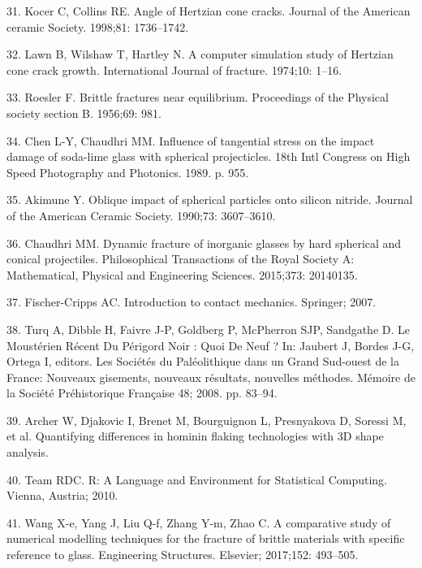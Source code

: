 \documentclass[10pt,letterpaper]{article}
\newenvironment{cslreferences}%
  {}%
  {\par}
\begin{document}
\begin{cslreferences}
\leavevmode\hypertarget{ref-kocer_angle_1998}{}%
31. Kocer C, Collins RE. Angle of Hertzian cone cracks. Journal of the
American ceramic Society. 1998;81: 1736--1742.

\leavevmode\hypertarget{ref-lawn_computer_1974}{}%
32. Lawn B, Wilshaw T, Hartley N. A computer simulation study of
Hertzian cone crack growth. International Journal of fracture. 1974;10:
1--16.

\leavevmode\hypertarget{ref-roesler_brittle_1956}{}%
33. Roesler F. Brittle fractures near equilibrium. Proceedings of the
Physical society section B. 1956;69: 981.

\leavevmode\hypertarget{ref-chen_influence_1989}{}%
34. Chen L-Y, Chaudhri MM. Influence of tangential stress on the impact
damage of soda-lime glass with spherical projecticles. 18th Intl
Congress on High Speed Photography and Photonics. 1989. p. 955.

\leavevmode\hypertarget{ref-akimune_oblique_1990}{}%
35. Akimune Y. Oblique impact of spherical particles onto silicon
nitride. Journal of the American Ceramic Society. 1990;73: 3607--3610.

\leavevmode\hypertarget{ref-chaudhri_dynamic_2015}{}%
36. Chaudhri MM. Dynamic fracture of inorganic glasses by hard spherical
and conical projectiles. Philosophical Transactions of the Royal Society
A: Mathematical, Physical and Engineering Sciences. 2015;373: 20140135.

\leavevmode\hypertarget{ref-fischer-cripps_introduction_2007}{}%
37. Fischer-Cripps AC. Introduction to contact mechanics. Springer;
2007.

\leavevmode\hypertarget{ref-jaubert_mousterien_2008}{}%
38. Turq A, Dibble H, Faivre J-P, Goldberg P, McPherron SJP, Sandgathe
D. Le Moustérien Récent Du Périgord Noir : Quoi De Neuf ? In: Jaubert J,
Bordes J-G, Ortega I, editors. Les Sociétés du Paléolithique dans un
Grand Sud-ouest de la France: Nouveaux gisements, nouveaux résultats,
nouvelles méthodes. Mémoire de la Société Préhistorique Française 48;
2008. pp. 83--94.

\leavevmode\hypertarget{ref-archer_quantifying_nodate}{}%
39. Archer W, Djakovic I, Brenet M, Bourguignon L, Presnyakova D,
Soressi M, et al. Quantifying differences in hominin flaking
technologies with 3D shape analysis.

\leavevmode\hypertarget{ref-team_r_2010}{}%
40. Team RDC. R: A Language and Environment for Statistical Computing.
Vienna, Austria; 2010.

\leavevmode\hypertarget{ref-wang_comparative_2017}{}%
41. Wang X-e, Yang J, Liu Q-f, Zhang Y-m, Zhao C. A comparative study of
numerical modelling techniques for the fracture of brittle materials
with specific reference to glass. Engineering Structures. Elsevier;
2017;152: 493--505.


\end{cslreferences}
\end{document}
